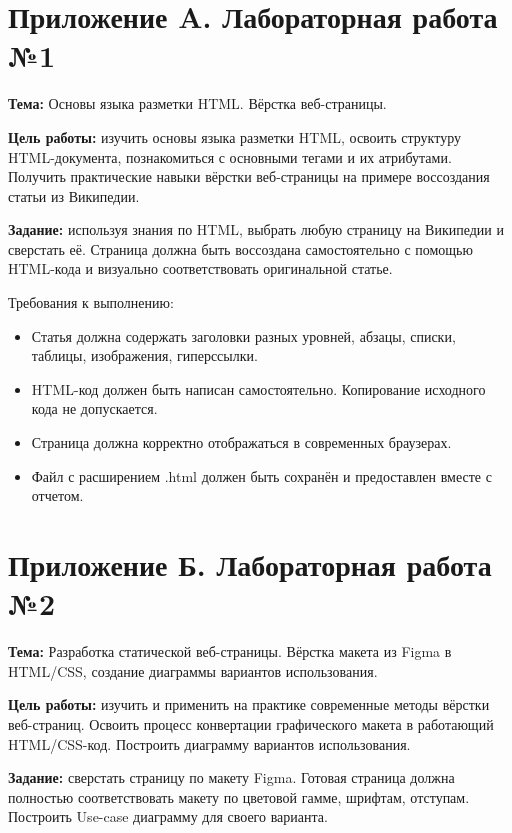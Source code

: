 \section*{Приложение A. Лабораторная работа №1}

\textbf{Тема:} Основы языка разметки HTML. Вёрстка веб-страницы.

\textbf{Цель работы:} изучить основы языка разметки HTML, освоить структуру HTML-документа, познакомиться с основными тегами и их атрибутами. Получить практические навыки вёрстки веб-страницы на примере воссоздания статьи из Википедии.

\textbf{Задание:} используя знания по HTML, выбрать любую страницу на Википедии и сверстать её. Страница должна быть воссоздана самостоятельно с помощью HTML-кода и визуально соответствовать оригинальной статье.

Требования к выполнению:
\begin{itemize}
    \item Статья должна содержать заголовки разных уровней, абзацы, списки, таблицы, изображения, гиперссылки.
    \item HTML-код должен быть написан самостоятельно. Копирование исходного кода не допускается.
    \item Страница должна корректно отображаться в современных браузерах.
    \item Файл с расширением .html должен быть сохранён и предоставлен вместе с отчетом.
\end{itemize}

\section*{Приложение Б. Лабораторная работа №2}

\textbf{Тема:} Разработка статической веб-страницы. Вёрстка макета из Figma в HTML/CSS, создание диаграммы вариантов использования.

\textbf{Цель работы:} изучить и применить на практике современные методы вёрстки веб-страниц. Освоить процесс конвертации графического макета в работающий HTML/CSS-код. Построить диаграмму вариантов использования.

\textbf{Задание:} сверстать страницу по макету Figma. Готовая страница должна полностью соответствовать макету по цветовой гамме, шрифтам, отступам. Построить Use-case диаграмму для своего варианта.

